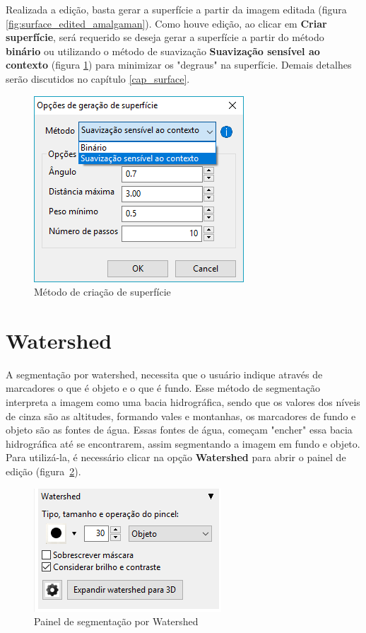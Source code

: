 \newpage
Realizada a edição, basta gerar a superfície a partir da imagem editada (figura
\ref{fig:surface_edited_amalgaman}). Como houve edição, ao clicar em \textbf{Criar superfície}, será
requerido se deseja gerar a superfície a partir do método \textbf{binário} ou utilizando o método de suavização
\textbf{Suavização sensível ao contexto} (figura \ref{fig:new_surface_edited}) para minimizar os "degraus" na superfície.
Demais detalhes serão discutidos no capítulo \ref{cap_surface}.

\begin{figure}[!htb]
\centering
\includegraphics[scale=0.5]{../user_guide_figures/invesalius_screen/surface_generation_dialog_pt.png}
\caption{Método de criação de superfície}
\label{fig:new_surface_edited}
\end{figure}


\section{Watershed}

A segmentação por watershed, necessita que o usuário indique através de marcadores o que é objeto e o que é fundo. Esse método de segmentação interpreta a imagem como uma bacia hidrográfica, sendo que os valores dos níveis de cinza são as altitudes, formando vales e montanhas, os marcadores de fundo e objeto são as fontes de água. Essas fontes de água, começam "encher" essa bacia hidrográfica até se encontrarem, assim segmentando a imagem em fundo e objeto. Para utilizá-la, é necessário clicar na opção \textbf{Watershed} para abrir o painel de edição (figura~\ref{fig:watershed_painel}).

\begin{figure}[!htb]
\centering
\includegraphics[scale=0.75]{../user_guide_figures/invesalius_screen/segmentation_watershed_panel_pt.png}
\caption{Painel de segmentação por Watershed}
\label{fig:watershed_painel}
\end{figure}

